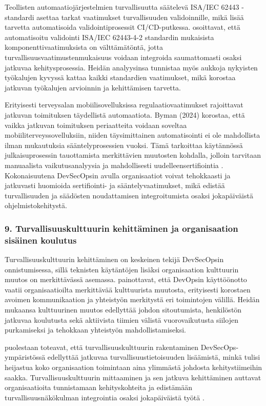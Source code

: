 \documentclass[bscthesis,finnish,oneside,biblatex]{uefcsthesis}
\begin{document}
Teollisten automaatiojärjestelmien turvallisuutta säätelevä ISA/IEC 62443 -standardi asettaa tarkat vaatimukset turvallisuuden validoinnille, mikä lisää tarvetta automatisoida validointiprosessit CI/CD-putkessa. \cite{gottel2023_validating} osoittavat, että automatisoitu validointi ISA/IEC 62443-4-2 standardin mukaisista komponenttivaatimuksista on välttämätöntä, jotta turvallisuusvaatimustenmukaisuus voidaan integroida saumattomasti osaksi jatkuvaa kehitysprosessia. Heidän analyysinsa tunnistaa myös aukkoja nykyisten työkalujen kyvyssä kattaa kaikki standardien vaatimukset, mikä korostaa jatkuvan työkalujen arvioinnin ja kehittämisen tarvetta.

Erityisesti terveysalan mobiilisovelluksissa regulaatiovaatimukset rajoittavat jatkuvan toimituksen täydellistä automaatiota. Byman (2024) korostaa, että vaikka jatkuvan toimituksen periaatteita voidaan soveltaa mobiiliterveyssovelluksiin, niiden täysimittainen automatisointi ei ole mahdollista ilman mukautuksia sääntelyprosessien vuoksi. Tämä tarkoittaa käytännössä julkaisuprosessin tauottamista merkittävien muutosten kohdalla, jolloin tarvitaan manuaalista vaikutusanalyysia ja mahdollisesti uudelleensertifiointia \cite{byman2024continuous}. Kokonaisuutena DevSecOpsin avulla organisaatiot voivat tehokkaasti ja jatkuvasti huomioida sertifiointi- ja sääntelyvaatimukset, mikä edistää turvallisuuden ja säädösten noudattamisen integroitumista osaksi jokapäiväistä ohjelmistokehitystä.


\subsubsection{9. Turvallisuuskulttuurin kehittäminen ja organisaation sisäinen koulutus}

Turvallisuuskulttuurin kehittäminen on keskeinen tekijä DevSecOpsin onnistumisessa, sillä teknisten käytäntöjen lisäksi organisaation kulttuurin muutos on merkittävässä asemassa. \cite{offerman2022_practices} painottavat, että DevOpsin käyttöönotto vaatii organisaatioilta merkittävää kulttuurista muutosta, erityisesti korostaen avoimen kommunikaation ja yhteistyön merkitystä eri toimintojen välillä. Heidän mukaansa kulttuurinen muutos edellyttää johdon sitoutumista, henkilöstön jatkuvaa koulutusta sekä aktiivista tiimien välistä vuorovaikutusta siilojen purkamiseksi ja tehokkaan yhteistyön mahdollistamiseksi.

\cite{chung2024_devsecops} puolestaan toteavat, että turvallisuuskulttuurin rakentaminen DevSecOps-ympäristössä edellyttää jatkuvaa turvallisuustietoisuuden lisäämistä, minkä tulisi heijastua koko organisaation toimintaan aina ylimmästä johdosta kehitystiimeihin saakka. Turvallisuuskulttuurin mittaaminen ja sen jatkuva kehittäminen auttavat organisaatioita tunnistamaan kehityskohteita ja edistämään turvallisuusnäkökulman integrointia osaksi jokapäiväistä työtä \cite{chung2024_devsecops, saleem2023_survey}.
\end{document}
